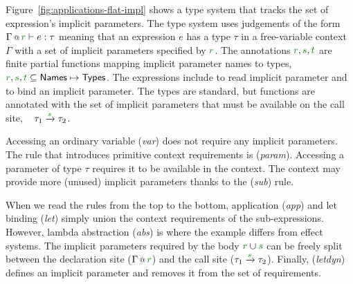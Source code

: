 Figure~\ref{fig:applications-flat-impl} shows a type system that tracks the set of expression's 
implicit parameters. The type system uses judgements of the form $\coctx{\Gamma}{\cclrd{r}} \vdash e : \tau$
meaning that an expression $e$ has a type $\tau$ in a free-variable context $\Gamma$ with a set 
of implicit parameters specified by $\cclrd{r}$. The annotations $\cclrd{r},\cclrd{s},\cclrd{t}$ are 
finite partial functions mapping implicit parameter names to types, \ie~$\cclrd{r},\cclrd{s},\cclrd{t} \subseteq 
\ident{Names} \mapsto \ident{Types}$. The expressions include  to read implicit
parameter and  to bind an implicit parameter. The types are standard, but functions are
annotated with the set of implicit parameters that must be available on the call site, \ie~
$\tau_1 \xrightarrow{\cclrd{s}} \tau_2$.

Accessing an ordinary variable (\emph{var}) does not require any implicit parameters. The rule that 
introduces primitive context requirements is (\emph{param}). Accessing a parameter  
of type $\tau$ requires it to be available in the context. The context may provide more (unused) 
implicit parameters thanks to the (\emph{sub}) rule.

When we read the rules from the top to the bottom, application (\emph{app}) and let binding 
(\emph{let}) simply union the context requirements of the sub-expressions. However, lambda abstraction
(\emph{abs}) is where the example differs from effect systems. The implicit parameters required by
the body $\cclrd{r} \cup \cclrd{s}$ can be freely split between the declaration site ($\coctx{\Gamma}{\cclrd{r}}$)
and the call site ($\tau_1 \xrightarrow{\cclrd{s}} \tau_2$). Finally, (\emph{letdyn}) defines an implicit
parameter and removes it from the set of requirements.

